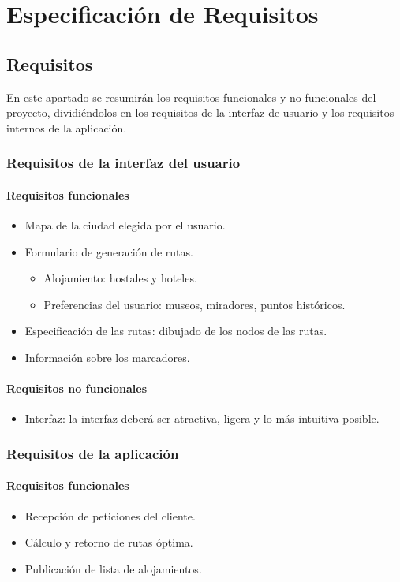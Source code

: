 \chapter{Especificación de  Requisitos}
\section[Requisitos]{Requisitos}
En este apartado se resumirán los requisitos funcionales y no funcionales del proyecto, dividiéndolos en los requisitos de la interfaz de usuario y los requisitos internos de la aplicación.
\subsection[Requisitos interfaz]{Requisitos de la interfaz del usuario}
\subsubsection[Requisitos funcionales]{Requisitos funcionales}
\begin{itemize}
	\item Mapa de la ciudad elegida por el usuario.
	\item Formulario de generación de rutas.
	\begin{itemize}
		\item Alojamiento: hostales y hoteles.
		\item Preferencias del usuario: museos, miradores, puntos históricos.
	\end{itemize}
	\item Especificación de las rutas: dibujado de los nodos de las rutas.
	\item Información sobre los marcadores.
\end{itemize}
\subsubsection[Requisitos no funcionales]{Requisitos no funcionales}
\begin{itemize}
	\item Interfaz: la interfaz deberá ser atractiva, ligera y lo más intuitiva posible.
\end{itemize}

\subsection[Requisitos internos]{Requisitos de la aplicación}
\subsubsection[Requisitos funcionales]{Requisitos funcionales}
\begin{itemize}
	\item Recepción de peticiones del cliente.
	\item Cálculo y retorno de rutas óptima.
	\item Publicación de lista de alojamientos.
\end{itemize}
